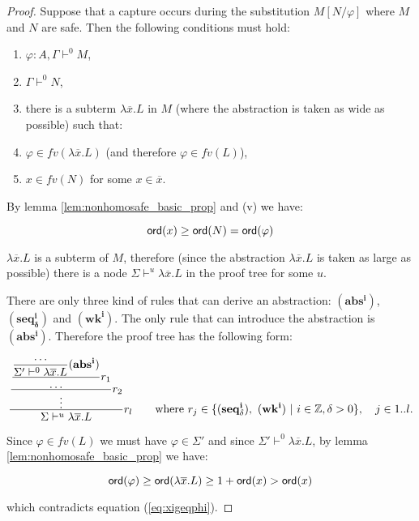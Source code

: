 \begin{proof}
Suppose that a capture occurs during the substitution $M[N/\varphi]$
where $M$ and $N$ are safe. Then the following conditions must hold:
\begin{enumerate}
\item $\varphi:A, \Gamma \vdash^0 M$,
\item $\Gamma \vdash^0 N$,
\item there is a subterm $\lambda \overline{x} . L$ in $M$ (where the abstraction is taken as wide as possible) such that:
\item $\varphi \in fv(\lambda \overline{x} . L)$ (and therefore $\varphi \in fv(L)$),
\item $x \in fv(N)$ for some $x \in \overline{x}$.
\end{enumerate}

By lemma \ref{lem:nonhomosafe_basic_prop} and (v) we have:

\begin{equation}
{\sf ord}(x) \geq {\sf ord}(N) = {\sf ord}(\varphi) \label{eq:xigeqphi}
\end{equation}

$\lambda \overline{x} . L$ is a subterm of $M$, therefore (since the
abstraction $\lambda \overline{x}.L$ is taken as large as possible)
there is a node $\Sigma \vdash^u \lambda \overline{x} . L$ in the
proof tree for some $u$.

There are only three kind of rules that can derive an abstraction:
$\mathbf{(abs^i)}$, $\mathbf{(seq^i_\delta)}$ and $\mathbf{(wk^i)}$.
The only rule that can introduce the abstraction is
$\mathbf{(abs^i)}$. Therefore the proof tree has the following form:

$$ \rule{
    \rule{
        \rule{
            \rule  {\ldots}
                   {\Sigma' \vdash^0 \lambda \overline{x} . L} \mathbf{(abs^i)}
        }
        {\ldots} r_1
    }
    {\vdots} r_2
    }
    { \Sigma \vdash^u \lambda \overline{x} . L } r_l
    \qquad \mbox{where } r_j \in \{ \mathbf{(seq^i_\delta)},\ \mathbf{(wk^i)}\ |\ i \in \zset, \delta > 0 \},
            \quad j\in 1..l.
$$


Since $\varphi \in fv (L)$ we must have $\varphi \in \Sigma'$ and
since $\Sigma' \vdash^0 \lambda \overline{x} . L$, by lemma
\ref{lem:nonhomosafe_basic_prop} we have:

$${\sf ord}(\varphi) \geq {\sf ord}(\lambda \overline{x} . L) \geq 1 + {\sf ord}(x) > {\sf ord}(x)$$

which contradicts equation (\ref{eq:xigeqphi}).
\end{proof}


